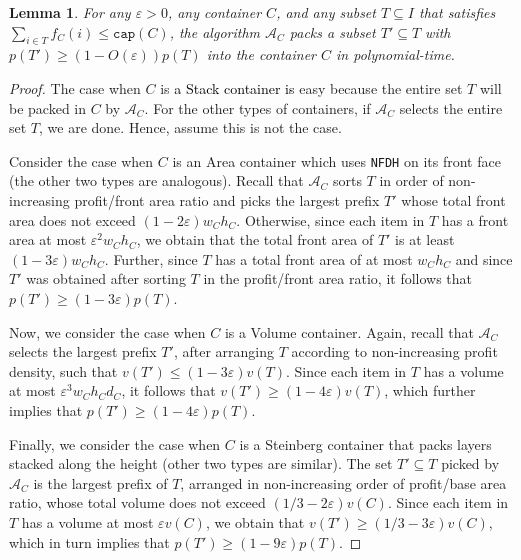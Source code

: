 \documentclass[10pt,a4paper]{amsart}
\newcommand{\kvnnew}[1]{\textcolor{black}{#1}}
\newcommand{\eps}{\varepsilon}
\newcommand{\AM}{\mathcal{A}}
\newcommand{\NFDH}{\texttt{NFDH}\xspace}
\newtheorem{lemma}[theorem]{Lemma}
\theoremstyle{definition}
\begin{document}
\begin{lemma}
    For any $\eps >0$, any container $C$, and any subset $T\subseteq I$ that satisfies $\sum_{i\in T} f_C(i) \le \mathtt{cap}(C)$, the algorithm $\AM_C$ packs a subset $T' \subseteq T$ with $p(T') \ge (1-O(\eps))p(T)$ into the container $C$ in polynomial-time.
\end{lemma}
\begin{proof}
    The case when $C$ is \kvnnew{a Stack container is} easy because the entire set $T$ will be packed in $C$ by $\AM_C$.
For the other types of containers, if $\AM_C$ selects the entire set $T$, we are done. Hence, assume this is not the case.

Consider the case when $C$ is an Area container which uses \NFDH on its front face (the other two types are analogous).
Recall that $\AM_C$ sorts $T$ in order of non-increasing profit/front area ratio and picks the largest prefix $T'$
whose total front area does not exceed $(1-2\eps)w_Ch_C$. Otherwise, since each item in $T$ has a front area at most $\eps^2w_Ch_C$,
we obtain that the total front area of $T'$ is at least $(1-3\eps)w_Ch_C$. Further, since $T$ has a total front area of at most $w_Ch_C$ and since $T'$ was obtained
after sorting $T$ in the profit/front area ratio, it follows that $p(T')\ge (1-3\eps)p(T)$.

Now, we consider the case when $C$ is a Volume container. Again, recall that $\AM_C$ selects the largest prefix $T'$, after arranging $T$ according to non-increasing profit density,
such that $v(T')\le (1-3\eps)v(T)$. Since each item in $T$ has a volume at most $\eps^3w_Ch_Cd_C$, it follows that $v(T')\ge (1-4\eps)v(T)$,
which further implies that $p(T')\ge (1-4\eps)p(T)$.

Finally, we consider the case when $C$ is a Steinberg container that packs layers stacked along the height (other two types are similar). 
The set $T'\subseteq T$ picked by $\AM_C$ is the largest prefix of $T$, arranged in non-increasing order of profit/base area ratio, whose
total volume does not exceed $(1/3-2\eps)v(C)$. Since each item in $T$ has a volume at most $\eps v(C)$,
we obtain that $v(T')\ge (1/3-3\eps)v(C)$, which in turn implies that $p(T')\ge (1-9\eps)p(T)$.
\end{proof}
\end{document}
